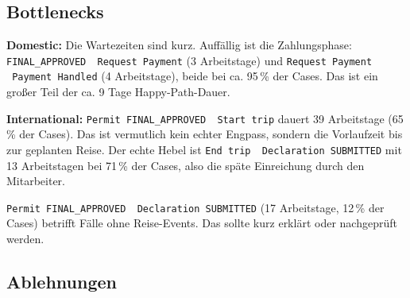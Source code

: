 %


\subsection{Bottlenecks}
\label{sec:bottlenecks}

\textbf{Domestic:} Die Wartezeiten sind kurz. Auffällig ist die Zahlungsphase:
\texttt{FINAL\_APPROVED \textrightarrow\ Request Payment} (3 Arbeitstage) und
\texttt{Request Payment \textrightarrow\ Payment Handled} (4 Arbeitstage), beide bei ca. 95\,\%
der Cases. Das ist ein großer Teil der ca. 9 Tage Happy-Path-Dauer.

\textbf{International:} \texttt{Permit FINAL\_APPROVED \textrightarrow\ Start trip}
dauert 39 Arbeitstage (65\,\% der Cases). Das ist vermutlich kein echter
Engpass, sondern die Vorlaufzeit bis zur geplanten Reise. Der echte Hebel
ist \texttt{End trip \textrightarrow\ Declaration SUBMITTED} mit 13 Arbeitstagen bei
71\,\% der Cases, also die späte Einreichung durch den Mitarbeiter.

\texttt{Permit FINAL\_APPROVED \textrightarrow\ Declaration SUBMITTED}
(17 Arbeitstage, 12\,\% der Cases) betrifft Fälle ohne Reise-Events.
Das sollte kurz erklärt oder nachgeprüft werden.

\subsection{Ablehnungen}
\label{sec:rejections}

%
%

